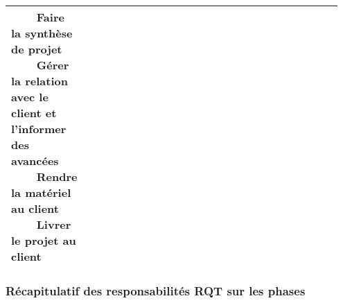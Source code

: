 \documentclass[a4paper,11pt,titlepage]{article}
\newcommand{\tabitem}{~~\llap{\textbullet}~~}
\begin{document}
\begin{longtable}{|p{0.15\linewidth}|p{0.8\linewidth}|}
{    \tabitem Faire la synthèse de projet                                                         \\
    \tabitem Gérer la relation avec le client et l'informer des avancées                         \\
    \tabitem Rendre la matériel au client                                                        \\
        \tabitem Livrer le projet au client
    }                                                                                            \\ \hline
\end{longtable}

\subsubsection{Récapitulatif des responsabilités RQT sur les phases}
\end{document}

